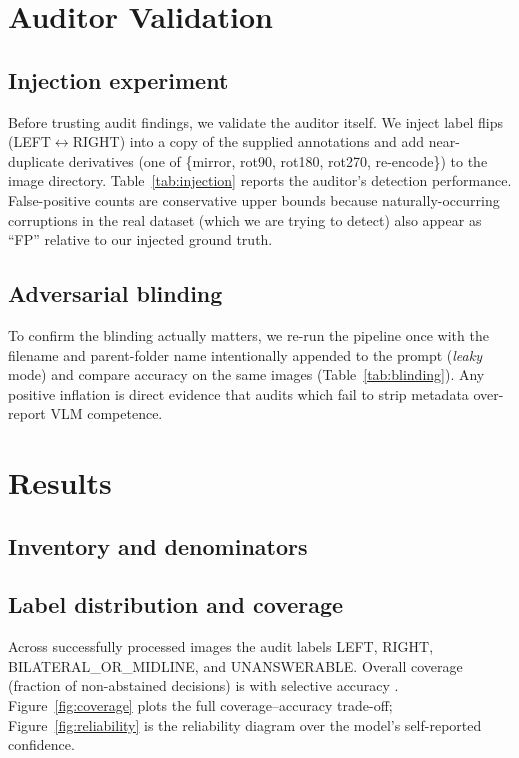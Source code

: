 \documentclass[conference]{IEEEtran}
\begin{document}
\section{Auditor Validation}

\subsection{Injection experiment}
Before trusting audit findings, we validate the auditor itself.
We inject \InjLabelKnown{} label flips (LEFT$\leftrightarrow$RIGHT) into a copy of
the supplied annotations and add \InjDupKnown{} near-duplicate derivatives
(one of \{mirror, rot90, rot180, rot270, re-encode\}) to the image
directory. Table~\ref{tab:injection} reports the auditor's detection
performance. False-positive counts are conservative upper bounds because
naturally-occurring corruptions in the real dataset (which we are trying to
detect) also appear as ``FP'' relative to our injected ground truth.



\subsection{Adversarial blinding}
To confirm the blinding actually matters, we re-run the pipeline once with
the filename and parent-folder name intentionally appended to the prompt
(\emph{leaky} mode) and compare accuracy on the same images
(Table~\ref{tab:blinding}). Any positive inflation is direct evidence that
audits which fail to strip metadata over-report VLM competence.



\section{Results}

\subsection{Inventory and denominators}


\subsection{Label distribution and coverage}
Across \NProcessed{} successfully processed images the audit labels
\NLeft{} LEFT, \NRight{} RIGHT, \NBilateral{} BILATERAL\_OR\_MIDLINE, and
\NUnanswerable{} UNANSWERABLE. Overall coverage
(fraction of non-abstained decisions) is \Coverage{} with selective
accuracy \SelAcc{}. Figure~\ref{fig:coverage} plots the full
coverage--accuracy trade-off; Figure~\ref{fig:reliability} is the reliability
diagram over the model's self-reported confidence.
\end{document}
